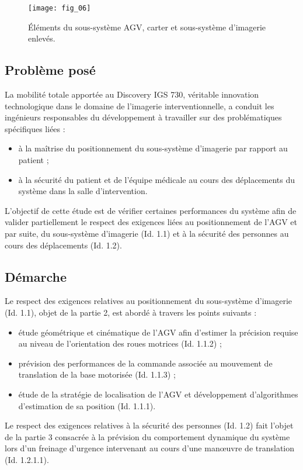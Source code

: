 \begin{figure}[!h]
\centering
\texttt{[image: fig\_06]}
\caption{\label{fig:06} Éléments du sous-système AGV, carter et sous-système d’imagerie enlevés.}
\end{figure}

\subsection{Problème posé}
La mobilité totale apportée au Discovery IGS 730, véritable innovation technologique dans le domaine de l’imagerie interventionnelle, a conduit les ingénieurs responsables du développement à travailler sur des problématiques spécifiques liées :
\begin{itemize}
\item à la maîtrise du positionnement du sous-système d’imagerie par rapport au patient ;
\item à la sécurité du patient et de l’équipe médicale au cours des déplacements du système dans la
salle d’intervention.
\end{itemize}
\begin{obj}
L’objectif de cette étude est de vérifier certaines performances du système afin de valider partiellement le respect des exigences liées au positionnement de l’AGV et par suite, du sous-système
d’imagerie (Id. 1.1) et à la sécurité des personnes au cours des déplacements (Id. 1.2).
\end{obj}


\subsection{Démarche}

Le respect des exigences relatives au positionnement du sous-système d’imagerie (Id. 1.1), objet de
la partie 2, est abordé à travers les points suivants :
\begin{itemize}
\item étude géométrique et cinématique de l’AGV afin d’estimer la précision requise au niveau de
l’orientation des roues motrices (Id. 1.1.2) ;
\item prévision des performances de la commande associée au mouvement de translation de la base
motorisée (Id. 1.1.3) ;
\item étude de la stratégie de localisation de l’AGV et développement d’algorithmes d’estimation
de sa position (Id. 1.1.1).
\end{itemize}
Le respect des exigences relatives à la sécurité des personnes (Id. 1.2) fait l’objet de la partie 3 consacrée à la prévision du comportement dynamique du système lors d’un freinage d’urgence intervenant
au cours d’une manœuvre de translation (Id. 1.2.1.1).

